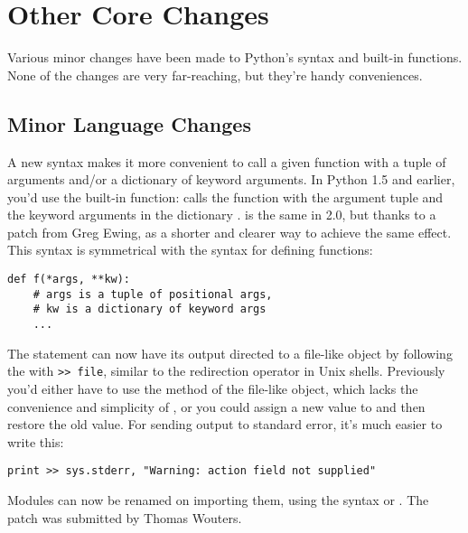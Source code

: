 \documentclass{howto}
\begin{document}
\section{Other Core Changes}

Various minor changes have been made to Python's syntax and built-in
functions.  None of the changes are very far-reaching, but they're
handy conveniences.

\subsection{Minor Language Changes}

A new syntax makes it more convenient to call a given function
with a tuple of arguments and/or a dictionary of keyword arguments.
In Python 1.5 and earlier, you'd use the 
built-in function:  calls the
function  with the argument tuple  and the
keyword arguments in the dictionary .   
is the same in 2.0, but thanks to a patch from
Greg Ewing,  as a shorter
and clearer way to achieve the same effect.  This syntax is
symmetrical with the syntax for defining functions:

\begin{verbatim}
def f(*args, **kw):
    # args is a tuple of positional args,
    # kw is a dictionary of keyword args
    ...
\end{verbatim}

The  statement can now have its output directed to a
file-like object by following the  with 
\verb|>> file|, similar to the redirection operator in Unix shells.
Previously you'd either have to use the  method of the
file-like object, which lacks the convenience and simplicity of
, or you could assign a new value to 
 and then restore the old value.  For sending output to standard error,
it's much easier to write this:

\begin{verbatim}
print >> sys.stderr, "Warning: action field not supplied"
\end{verbatim}

Modules can now be renamed on importing them, using the syntax
 or .  The patch was submitted by
Thomas Wouters.
\end{document}
